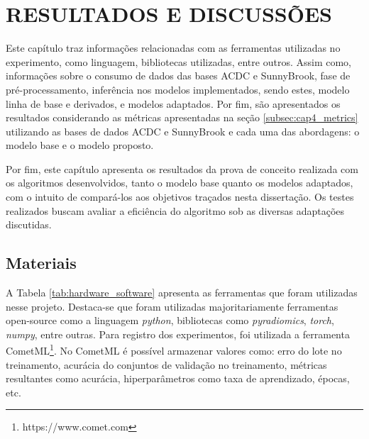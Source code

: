 \chapter{RESULTADOS E DISCUSSÕES}
\label{chap:proposta_experimental}

Este capítulo traz informações relacionadas com as ferramentas utilizadas no experimento, como linguagem, bibliotecas utilizadas, entre outros. Assim como, informações sobre o consumo de dados das bases \gls{ACDC} e SunnyBrook, fase de pré-processamento, inferência nos modelos implementados, sendo estes, modelo linha de base e derivados, e modelos adaptados. Por fim, são apresentados os resultados considerando as métricas apresentadas na seção \ref{subsec:cap4_metrics} utilizando as bases de dados ACDC e SunnyBrook e cada uma das abordagens: o modelo base e o modelo proposto.

Por fim, este capítulo apresenta os resultados da prova de conceito realizada com os algoritmos desenvolvidos, tanto o modelo base quanto os modelos adaptados, com o intuito de compará-los aos objetivos traçados nesta dissertação. Os testes realizados buscam avaliar a eficiência do algoritmo sob as diversas adaptações discutidas. 

\section{Materiais} 
\label{sec:cap5_materiais}

A Tabela \ref{tab:hardware_software} apresenta as ferramentas que foram utilizadas nesse projeto. Destaca-se que foram utilizadas majoritariamente ferramentas open-source como a linguagem \textit{python}, bibliotecas como \textit{pyradiomics}, \textit{torch}, \textit{numpy}, entre outras. Para registro dos experimentos, foi utilizada a ferramenta CometML\footnote{https://www.comet.com}. No CometML é possível armazenar valores como: erro do lote no treinamento, acurácia do conjuntos de validação no treinamento, métricas resultantes como acurácia, hiperparâmetros como taxa de aprendizado, épocas, etc.
\newline

